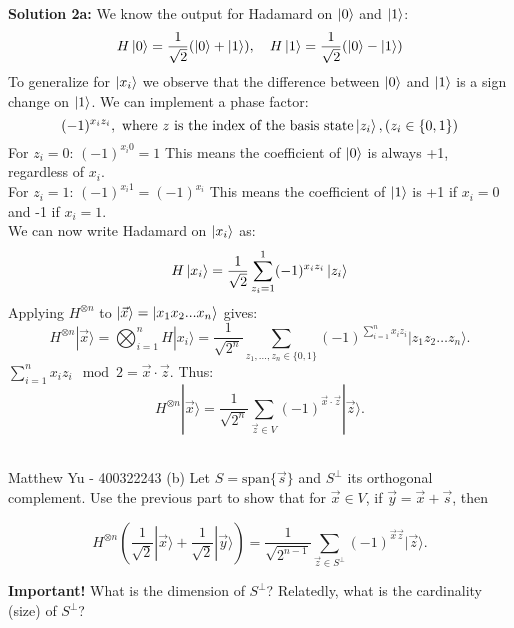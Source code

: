 \documentclass{article}
\begin{document}
\textbf{Solution 2a:} We know the output for Hadamard on $\ket{0}$ and $\ket{1}$:
$$H\ket{0}=\frac{1}{\sqrt{2}}(\ket{0}+\ket{1}), \quad H\ket{1}=\frac{1}{\sqrt{2}}(\ket{0}-\ket{1})$$ To generalize for $\ket{x_i}$ we observe that the difference between $\ket{0}$ and $\ket{1}$ is a sign change on $\ket{1}$. We can implement a phase factor: $$(-1)^{x_iz_i},\text{ where } z \text{ is the index of the basis state} \ket{z_i} , (z_i\in \{0,1\})$$
For $z_i=0$: $(-1)^{x_i0}=1$ This means the coefficient of $\ket{0}$ is always +1, regardless of $x_i$.\\
For $z_i=1$: $(-1)^{x_i1}=(-1)^{x_i}$ This means the coefficient of $\ket{1}$ is +1 if $x_i=0$ and -1 if $x_i=1$.\\
We can now write Hadamard on $\ket{x_i}$ as: $$H\ket{x_i}=\frac{1}{\sqrt{2}}\sum^1_{z_i=1}(-1)^{x_iz_i}\ket{z_i}$$
Applying $H^{\otimes n}$ to $\ket{\vec{x}}=\ket{x_1x_2...x_n}$ gives: 
$$H^{\otimes n}|\vec{x}\rangle = \bigotimes_{i=1}^n H|x_i\rangle = \frac{1}{\sqrt{2^n}} \sum_{z_1, \dots, z_n \in \{0,1\}} (-1)^{\sum_{i=1}^n x_i z_i} |z_1 z_2 \dots z_n\rangle.$$
\(\sum_{i=1}^n x_i z_i \mod 2 = \vec{x} \cdot \vec{z}\). Thus:
$$\boxed{
H^{\otimes n}|\vec{x}\rangle = \frac{1}{\sqrt{2^n}} \sum_{\vec{z} \in V} (-1)^{\vec{x} \cdot \vec{z}} |\vec{z}\rangle.}$$

\newpage
\begin{question}[title=QUESTION 2b]\\
Matthew Yu - 400322243
(b) Let \(S = \text{span}\{\vec{s}\}\) and \(S^{\perp}\) its orthogonal complement. Use the previous part to show that for \(\vec{x} \in V\), if \(\vec{y} = \vec{x} + \vec{s}\), then

\[
H^{\otimes n}\left(\frac{1}{\sqrt{2}}|\vec{x}\rangle + \frac{1}{\sqrt{2}}|\vec{y}\rangle\right) = \frac{1}{\sqrt{2^{n-1}}} \sum_{\vec{z} \in S^{\perp}} (-1)^{\vec{x}\vec{z}}|\vec{z}\rangle.
\]

\textbf{Important!} What is the dimension of \(S^{\perp}\)? Relatedly, what is the cardinality (size) of \(S^{\perp}\)?
\end{question}
\end{document}
